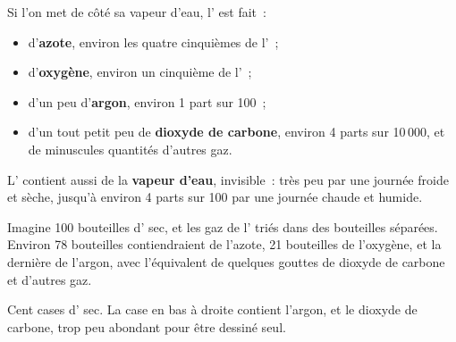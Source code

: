 \begin{proposition}\label{prop:g4:air-a-mixture-of-gases:composition}
Si l'on met de côté sa vapeur d'eau, l' est fait~:
\begin{itemize}
  \item d'\textbf{azote}, environ les quatre cinquièmes de l'~;
  \item d'\textbf{oxygène}, environ un cinquième de l'~;
  \item d'un peu d'\textbf{argon}, environ 1 part sur 100~;
  \item d'un tout petit peu de \textbf{dioxyde de carbone}, environ 4
        parts sur 10\,000, et de minuscules quantités d'autres gaz.
\end{itemize}
L' contient aussi de la \textbf{vapeur d'eau}, invisible~: très peu
par une journée froide et sèche, jusqu'à environ 4 parts sur 100 par une
journée chaude et humide.
\end{proposition}

\begin{example}\label{ex:g4:air-a-mixture-of-gases:hundred}
Imagine 100 bouteilles d' sec, et les gaz de l' triés dans des
bouteilles séparées. Environ 78 bouteilles contiendraient de l'azote,
21 bouteilles de l'oxygène, et la dernière de l'argon, avec l'équivalent
de quelques gouttes de dioxyde de carbone et d'autres gaz.
\end{example}

\begin{omfigure}

{\small Cent cases d' sec. La case en bas à droite contient l'argon,
et le dioxyde de carbone, trop peu abondant pour être dessiné seul.}
\end{omfigure}


